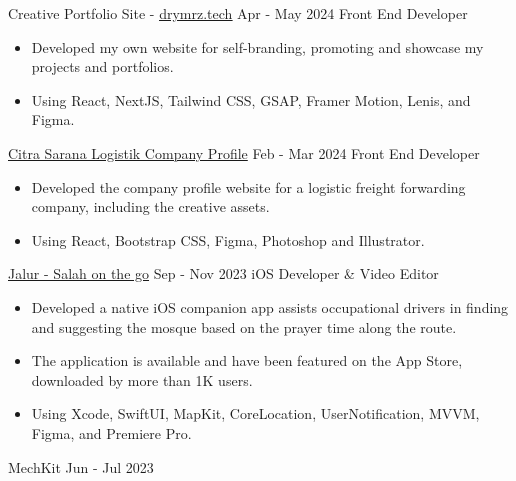 \documentclass[9pt]{developercv}
\begin{document}
\vspace{-5pt}
\begin{minipage}[t]{0.46\textwidth}
    \begin{entrylist}
        \entry
    		{Creative Portfolio Site - \href{https://drymrz.tech}{\underline{drymrz.tech}}}
    		{Apr - May 2024}
    		{Front End Developer}
    		{
                    \begin{itemize}[noitemsep,topsep=0pt,parsep=0pt,partopsep=0pt, leftmargin=8pt]
                        \item Developed my own website for self-branding, promoting and showcase my projects and portfolios.
    				\item Using React, NextJS, Tailwind CSS, GSAP, Framer Motion, Lenis, and Figma.
                    \end{itemize} 
                }
        \entry
    		{\href{https://citrasaranalogistik.com}{Citra Sarana Logistik Company Profile}}
    		{Feb - Mar 2024}
    		{Front End Developer}
    		{
                    \begin{itemize}[noitemsep,topsep=0pt,parsep=0pt,partopsep=0pt, leftmargin=8pt]
                        \item Developed the company profile website for a logistic freight forwarding company, including the creative assets.
    				\item Using React, Bootstrap CSS, Figma, Photoshop and Illustrator.
                    \end{itemize} 
                }
        \entry
    		{\href{https://apps.apple.com/id/app/jalur/id6470788874}{ Jalur - Salah on the go}}
    		{Sep - Nov 2023}
    		{iOS Developer \& Video Editor}
    		{
                    \begin{itemize}[noitemsep,topsep=0pt,parsep=0pt,partopsep=0pt, leftmargin=8pt]
                        \item Developed a native iOS companion app assists occupational drivers in finding and suggesting the mosque based on the prayer time along the route.
                        \item The application is available and have been featured on the App Store, downloaded by more than 1K users.
    				\item Using Xcode, SwiftUI, MapKit, CoreLocation,           UserNotification, MVVM, Figma, and Premiere Pro.
                    \end{itemize} 
                }
        \entry
    		{MechKit}
    		{Jun - Jul 2023}

\end{entrylist}
\end{minipage}
\end{document}
